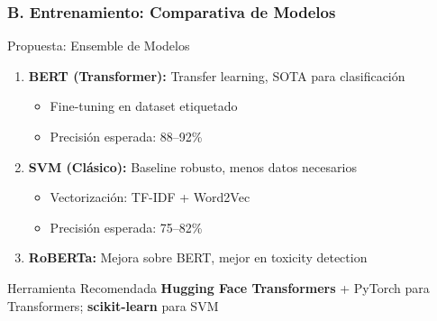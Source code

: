\documentclass[aspectratio=169,10pt]{beamer}
\begin{document}
\begin{frame}
  \frametitle{B. Entrenamiento: Comparativa de Modelos}
  
  \begin{block}{Propuesta: Ensemble de Modelos \cite{devlin2018bert}}
    \begin{enumerate}
      \item \textbf{BERT (Transformer):} Transfer learning, SOTA para clasificación
        \begin{itemize}
          \item Fine-tuning en dataset etiquetado
          \item Precisión esperada: 88--92\%
        \end{itemize}
      \item \textbf{SVM (Clásico):} Baseline robusto, menos datos necesarios
        \begin{itemize}
          \item Vectorización: TF-IDF + Word2Vec
          \item Precisión esperada: 75--82\%
        \end{itemize}
      \item \textbf{RoBERTa:} Mejora sobre BERT, mejor en toxicity detection \cite{liu2019roberta}
    \end{enumerate}
  \end{block}

  \begin{block}{Herramienta Recomendada}
    \textbf{Hugging Face Transformers} + PyTorch para Transformers; \textbf{scikit-learn} para SVM
  \end{block}
\end{frame}
\end{document}
